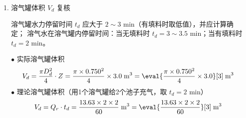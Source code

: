 \begin{enumerate}
	\item 溶气罐体积 $V_d$ 复核
	
	溶气罐水力停留时间 $t_d$ 应大于 $2 \sim 3$ min（有填料时取低值），并应计算确定；
	溶气水在溶气罐内停留时间：当无填料时 $t_d = 3\sim 3.5$ min；当有填料时 $t_d =2$ min。

	$\bullet $ 实际溶气罐体积
	\begin{align}
		V_d = \dfrac{\pi D_d^2}{4} \cdot Z = \dfrac{\pi \times 0.750^2}{4} \times 3.0 \;\text{m$^3$} = \eval{\dfrac{\pi \times 0.750^2}{4} \times 3.0}[3] \;\text{m$^3$}
	\end{align}
	$\bullet $ 理论溶气罐体积（用1个溶气罐给2个池子充气，取 $t_d =2$ min）
	\begin{align}
		V_d = Q_r \cdot t_d = \dfrac{13.63 \times 2 \times 2}{60} \;\text{m$^3$} = \eval{\dfrac{13.63 \times 2 \times 2}{60}}[3] \;\text{m$^3$}
	\end{align}

	
	
\end{enumerate}


	
	

	


